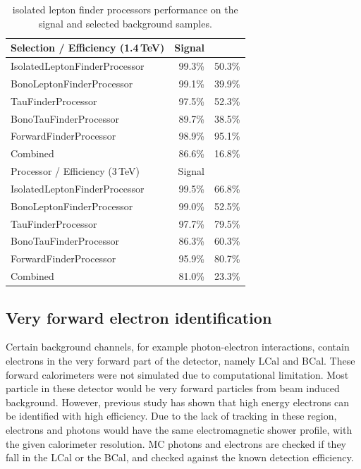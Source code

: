 \begin{table}[!tbp]
\begin{tabular}{lrr}
\hline
\hline
Selection / Efficiency (1.4\,TeV)  &  Signal & \HepProcess{\Pquark\Pquark\Pquark\Pquark\Plepton\Pnu} \\
\hline
IsolatedLeptonFinderProcessor & 99.3\% & 50.3\%  \\
BonoLeptonFinderProcessor & 99.1\% & 39.9\%  \\
TauFinderProcessor & 97.5\% & 52.3\%  \\
BonoTauFinderProcessor & 89.7\% & 38.5\%  \\
ForwardFinderProcessor & 98.9\% & 95.1\%  \\
Combined & 86.6\% & 16.8\%  \\
\hline
Processor / Efficiency (3\,TeV)  &  Signal  & \HepProcess{\Pquark\Pquark\Pquark\Pquark\Plepton\Pnu} \\
\hline
IsolatedLeptonFinderProcessor & 99.5\% & 66.8\%  \\
BonoLeptonFinderProcessor & 99.0\% & 52.5\%  \\
TauFinderProcessor & 97.7\% & 79.5\%  \\
BonoTauFinderProcessor & 86.3\% & 60.3\%  \\
ForwardFinderProcessor & 95.9\% & 80.7\%  \\
Combined & 81.0\% & 23.3\%  \\
\hline
\hline

\end{tabular}
\caption{isolated lepton finder processors performance on the signal and selected background samples.}
\label{tab:doubleHiggsIsoLepPerformance}
\end{table}

\subsection{Very forward electron identification}

Certain background channels, for example photon-electron interactions, contain electrons in the very forward part of the detector, namely LCal and BCal. These forward calorimeters were not simulated due to computational limitation. Most particle in these detector would be very forward particles from beam induced background. However, previous study has shown \cite{} that high energy electrons can be identified with high efficiency. Due to the lack of tracking in these region, electrons and photons would have the same electromagnetic shower profile, with the given calorimeter resolution. MC photons and electrons are checked if they fall in the LCal or the BCal, and checked against the known detection efficiency.

